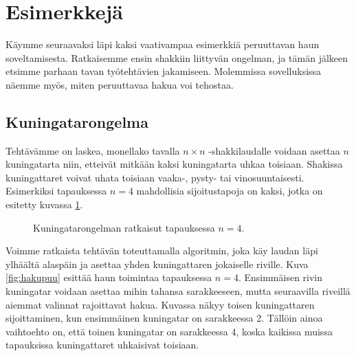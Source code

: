 \section{Esimerkkejä}

Käymme seuraavaksi läpi kaksi vaativampaa esimerkkiä
peruuttavan haun soveltamisesta.
Ratkaisemme ensin shakkiin liittyvän ongelman,
ja tämän jälkeen etsimme parhaan tavan
työtehtävien jakamiseen.
Molemmissa sovelluksissa näemme myös,
miten peruuttavaa hakua voi tehostaa.

\subsection{Kuningatarongelma}

Tehtävämme on laskea, monellako tavalla
$n \times n$ -shakkilaudalle voidaan asettaa $n$ kuningatarta
niin, etteivät mitkään kaksi kuningatarta uhkaa toisiaan.
Shakissa kuningattaret voivat uhata toisiaan
vaaka-, pysty- tai vinosuuntaisesti.
Esimerkiksi tapauksessa $n=4$ mahdollisia sijoitustapoja on kaksi,
jotka on esitetty kuvassa \ref{fig:kuning}.

\begin{figure}
\center
{}
\caption{Kuningatarongelman ratkaisut tapauksessa $n=4$.}
\label{fig:kuning}
\end{figure}

Voimme ratkaista tehtävän toteuttamalla algoritmin,
joka käy laudan läpi ylhäältä alaspäin ja asettaa yhden kuningattaren
jokaiselle riville.
Kuva \ref{fig:hakupuu} esittää haun toimintaa tapauksessa $n=4$.
Ensimmäisen rivin kuningatar voidaan asettaa mihin tahansa sarakkeeseen,
mutta seuraavilla riveillä aiemmat valinnat rajoittavat hakua.
Kuvassa näkyy toisen kuningattaren sijoittaminen,
kun ensimmäinen kuningatar on sarakkeessa 2.
Tällöin ainoa vaihtoehto on, että toinen kuningatar on sarakkeessa 4,
koska kaikissa muissa tapauksissa kuningattaret uhkaisivat toisiaan.


